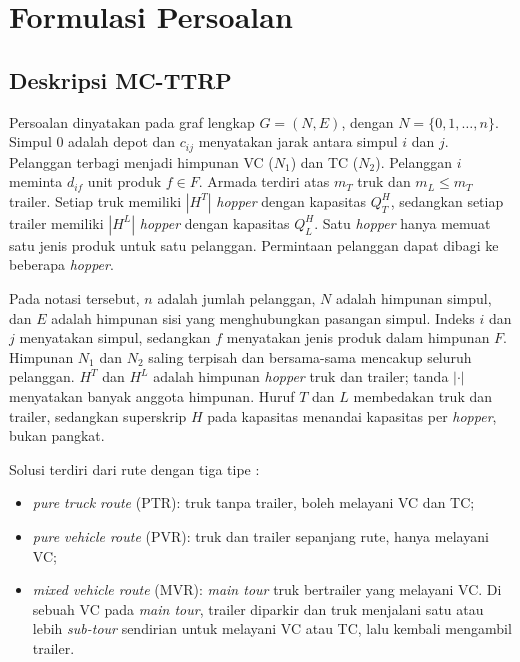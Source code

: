 \documentclass[conference]{IEEEtran}
\begin{document}
\section{Formulasi Persoalan}\label{sec:formulasi}

\subsection{Deskripsi MC-TTRP}

Persoalan dinyatakan pada graf lengkap $G=(N,E)$, dengan $N=\{0,1,\dots,n\}$. Simpul 0 adalah depot dan $c_{ij}$ menyatakan jarak antara simpul $i$ dan $j$. Pelanggan terbagi menjadi himpunan VC ($N_1$) dan TC ($N_2$). Pelanggan $i$ meminta $d_{if}$ unit produk $f\in F$. Armada terdiri atas $m_T$ truk dan $m_L\le m_T$ trailer. Setiap truk memiliki $|H^T|$ \textit{hopper} dengan kapasitas $Q_T^H$, sedangkan setiap trailer memiliki $|H^L|$ \textit{hopper} dengan kapasitas $Q_L^H$. Satu \textit{hopper} hanya memuat satu jenis produk untuk satu pelanggan. Permintaan pelanggan dapat dibagi ke beberapa \textit{hopper}.

Pada notasi tersebut, $n$ adalah jumlah pelanggan, $N$ adalah himpunan simpul, dan $E$ adalah himpunan sisi yang menghubungkan pasangan simpul. Indeks $i$ dan $j$ menyatakan simpul, sedangkan $f$ menyatakan jenis produk dalam himpunan $F$. Himpunan $N_1$ dan $N_2$ saling terpisah dan bersama-sama mencakup seluruh pelanggan. $H^T$ dan $H^L$ adalah himpunan \textit{hopper} truk dan trailer; tanda $|\cdot|$ menyatakan banyak anggota himpunan. Huruf $T$ dan $L$ membedakan truk dan trailer, sedangkan superskrip $H$ pada kapasitas menandai kapasitas per \textit{hopper}, bukan pangkat.

Solusi terdiri dari rute dengan tiga tipe \cite{chao2002,davila2023}:
\begin{itemize}
\item \textit{pure truck route} (PTR): truk tanpa trailer, boleh melayani VC dan TC;
\item \textit{pure vehicle route} (PVR): truk dan trailer sepanjang rute, hanya melayani VC;
\item \textit{mixed vehicle route} (MVR): \textit{main tour} truk bertrailer yang melayani VC. Di sebuah VC pada \textit{main tour}, trailer diparkir dan truk menjalani satu atau lebih \textit{sub-tour} sendirian untuk melayani VC atau TC, lalu kembali mengambil trailer.
\end{itemize}
\end{document}
